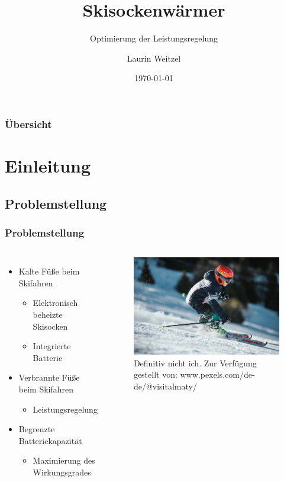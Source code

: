 \documentclass{beamer}
\title{Skisockenwärmer}
\subtitle{Optimierung der Leistungsregelung}
\author{Laurin Weitzel}
\institute{Simulation mit pSpice}
\date{\today}
\begin{document}
	\begin{frame}
		\titlepage
	\end{frame}
	\begin{frame}
		\frametitle{Übersicht}
		\tableofcontents
	\end{frame}
	\section{Einleitung}
	\subsection{Problemstellung}
	\begin{frame}
		\frametitle{Problemstellung}
		\begin{columns}
			\column{0.5\textwidth}
			\begin{itemize}
				\item{Kalte Füße beim Skifahren}
				\begin{itemize}
					\item{Elektronisch beheizte Skisocken}
					\item{Integrierte Batterie}
				\end{itemize}
				\item{Verbrannte Füße beim Skifahren}
				\begin{itemize}
					\item{Leistungsregelung}
				\end{itemize}
				\item{Begrenzte Batteriekapazität}
				\begin{itemize}
					\item{Maximierung des Wirkungsgrades}
				\end{itemize}
			\end{itemize}
			\column{0.5\textwidth}
			\begin{figure}[tbh]
				\centering
				\includegraphics[width=1\linewidth]{medien/skifahrer}
				\caption[Nicht ich auf Skiern.]{Definitiv nicht ich. Zur Verfügung gestellt von: www.pexels.com/de-de/@visitalmaty/}
				\label{fig:skifahrer}
			\end{figure}
		\end{columns}
	\end{frame}
\end{document}
